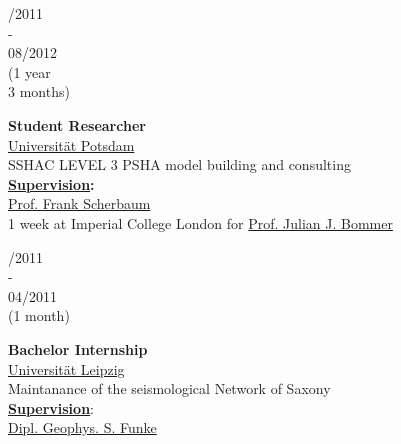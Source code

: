 \documentclass{article}
\begin{document}
\begin{minipage}[t]{0.69\textwidth}
\begin{minipage}{0.49\textwidth}
		\vspace{0.5cm}
		
		\begin{minipage}[t]{0.25\textwidth}
		/2011\\ -\\ 08/2012 \\(1 year \\3 months)
		\end{minipage}
		\hfill
		\begin{minipage}[t]{0.75\textwidth}
		\textbf{Student Researcher}\\
		\href{https://www.uni-potsdam.de/}{\color{pblue}Universität Potsdam}\\
	    SSHAC LEVEL 3 PSHA model building and consulting\\
	      \textbf{\underline{Supervision}:}\\
	     \href{http://www.geo.uni-potsdam.de/mitarbeiterdetails/show/96/Frank_Scherbaum.html/}{\color{pblue}Prof. Frank Scherbaum}\\
	    1 week at Imperial College London for \href{https://www.imperial.ac.uk/people/j.bommer}{\color{pblue}Prof. Julian J. Bommer}
		\end{minipage}
		
		\vspace{0.5cm}
		
		\begin{minipage}[t]{0.25\textwidth}
		/2011\\ - \\ 04/2011\\(1 month)
		\end{minipage}		
		\hfill
		\begin{minipage}[t]{0.75\textwidth}
		\textbf{Bachelor Internship}\\
		\href{http://geologie.physgeo.uni-leipzig.de}{\color{pblue}Universität Leipzig}\\
	    Maintanance of the seismological Network of Saxony\\ 
	     \textbf{\underline{Supervision}}: \\
	     \href{mailto:sfunke@rz.uni-leipzig.de}{Dipl. Geophys. S. Funke}
		\end{minipage}
		
		\vspace{0.5cm}
		

\end{minipage}
\end{minipage}
\end{document}
